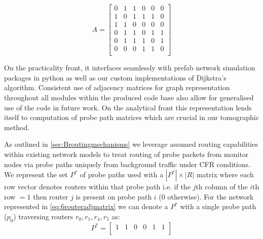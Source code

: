\begin{equation}\label{eq:6routeradjmatrix}
    A = \begin{bmatrix} 
        0 & 1 & 1 & 0 & 0 & 0 \\
        1 & 0 & 1 & 1 & 1 & 0 \\
        1 & 1 & 0 & 0 & 0 & 0 \\
        0 & 1 & 1 & 0 & 1 & 1 \\
        0 & 1 & 1 & 1 & 0 & 1 \\
        0 & 0 & 0 & 1 & 1 & 0 \\\end{bmatrix}
\end{equation}

On the practicality front, it interfaces seamlessly with prefab network simulation packages in python as well as our custom implementations of Dijkstra's algorithm. Consistent use of adjacency matrices for graph representation throughout all modules within the produced code base also allow for generalised use of the code in future work. On the analytical front this representation lends itself to computation of probe path matrices which are crucial in our tomographic method.\par
As outlined in \cref{sec:Broutingmechanisms} we leverage assumed routing capabilities within existing network models to treat routing of probe packets from monitor nodes via probe paths uniquely from background traffic under CFR conditions. We represent the set $P^*$ of probe paths used with a $|P^*|\times |R|$ matrix where each row vector denotes routers within that probe path i.e. if the $j$th column of the $i$th row $= 1$ then router $j$ is present on probe path $i$ (0 otherwise). For the network represented in \cref{eq:6routeradjmatrix} we can denote a $P^*$ with a single probe path ($p_0$) traversing routers $r_0,r_1,r_4,r_5$ as:
\begin{equation*}
    P^*=\begin{bmatrix}
        1 & 1 & 0 & 0 & 1 & 1\\ 
    \end{bmatrix}
\end{equation*}

